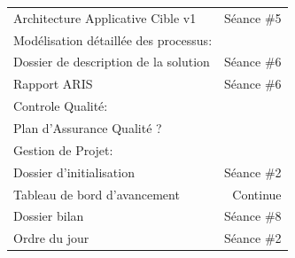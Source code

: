 \documentclass[]{scrartcl}
\begin{document}
\begin{table}[h!]
\begin{tabular}{l r}
       \hspace{0.66cm}  Architecture Applicative Cible v1& Séance \#5\\ 
         \hspace{0.33cm}   Modélisation détaillée des processus: &\\
                \hspace{0.66cm}  Dossier de description de la solution&Séance \#6\\ 
       \hspace{0.66cm}  Rapport ARIS & Séance \#6\\
         \hspace{0.33cm}   Controle Qualité: & \\
                \hspace{0.66cm} Plan d'Assurance Qualité ?\\ 
                \midrule
                Gestion de Projet: &\\
                \midrule
			\hspace{0.33cm}   Dossier d'initialisation & Séance \#2\\
			\hspace{0.33cm}   Tableau de bord d'avancement & Continue\\
			\hspace{0.33cm}   Dossier bilan & Séance \#8\\
			\hspace{0.33cm}   Ordre du jour  & Séance \#2\\
        \midrule%
        \bottomrule%
   \end{tabular}%
   \label{tab:sample_label}%
   \end{table}
\end{document}
